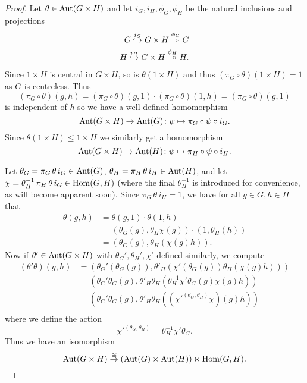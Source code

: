 \begin{proof}
    Let $\theta \in \mathrm{Aut}(G \times H)$ and let $i_G, i_H, \phi_G, \phi_H$ be the natural inclusions and projections
    \begin{align*}
        G \overset{i_G}{\hookrightarrow} G \times H \overset{\phi_G}{\twoheadrightarrow} G \\
        H \overset{i_H}{\hookrightarrow} G \times H \overset{\phi_H}{\twoheadrightarrow} H.
    \end{align*}
    Since $1 \times H$ is central in $G \times H$, so is $\theta(1 \times H)$ and thus $(\pi_G \circ \theta)(1 \times H) = 1$ as $G$ is centreless.
    Thus \[
        (\pi_G \circ \theta)(g, h) = (\pi_G \circ \theta)(g, 1) \cdot (\pi_G \circ \theta)(1, h) = (\pi_G \circ \theta)(g, 1)
    \] is independent of $h$ so we have a well-defined homomorphism \[
        \mathrm{Aut}(G \times H) \to \mathrm{Aut}(G) \colon \psi \mapsto \pi_G \circ \psi \circ i_G.
    \]
    Since $\theta(1 \times H) \leq 1 \times H$ we similarly get a homomorphism \[
        \mathrm{Aut}(G \times H) \to \mathrm{Aut}(H) \colon \psi \mapsto \pi_H \circ \psi \circ i_H.
    \]

    Let $\theta_G = \pi_G \, \theta \, i_G \in \mathrm{Aut}(G)$, $\theta_H = \pi_H \, \theta \, i_H \in \mathrm{Aut}(H)$, and let $\chi = \theta_H^{-1} \, \pi_H \, \theta \, i_G \in \mathrm{Hom}(G, H)$ (where the final $\theta_H^{-1}$ is introduced for convenience, as will become apparent soon).
    Since $\pi_G \, \theta \, i_H = 1$, we have for all $g \in G, h \in H$ that
     \begin{align*}
         \theta(g, h)
             &= \theta(g, 1) \cdot \theta(1, h) \\
             &= (\theta_G(g), \theta_H \chi(g)) \cdot (1, \theta_H (h)) \\
             &= (\theta_G(g), \theta_H (\chi(g) h)).
     \end{align*}
     Now if $\theta' \in \mathrm{Aut}(G \times H)$ with $\theta_G', \theta_H', \chi'$ defined similarly, we compute
     \begin{align*}
         (\theta' \theta)(g, h)
            &= (\theta_G'(\theta_G(g)), \theta'_H\left(\chi'(\theta_G(g)) \theta_H(\chi(g) h) \right)) \\
            &= (\theta_G'\theta_G(g), \theta'_H \theta_H \left(\theta_H^{-1} \chi'\theta_G(g) \chi(g) h \right)) \\
            &= (\theta_G'\theta_G(g), \theta'_H \theta_H \left((\chi'^{(\theta_G, \theta_H)} \chi)(g) h \right)) \\
     \end{align*}
     where we define the action \[
         \chi'^{(\theta_G, \theta_H)} = \theta_H^{-1} \chi' \theta_G.
     \]
     Thus we have an isomorphism \[
        \mathrm{Aut}(G \times H) \overset{\cong}{\to} (\mathrm{Aut}(G) \times \mathrm{Aut}(H)) \ltimes \mathrm{Hom}(G, H).
     \]
\end{proof}

